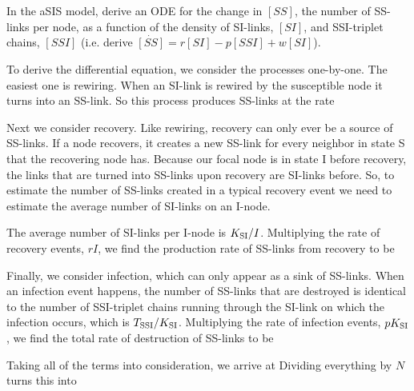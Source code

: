 In the aSIS model, derive an ODE for the change in $[SS]$, the number of SS-links per node, as a function of the density of SI-links, $[SI]$, and SSI-triplet chains, $[SSI]$ (i.e. derive $\dot{[SS]} = r[SI]-p[SSI]+w[SI]$).

\solution
To derive the differential equation, we consider the processes one-by-one. The easiest one is rewiring. When an SI-link is rewired by the susceptible node it turns into an SS-link. So this process produces SS-links at the rate 

Next we consider recovery. Like rewiring, recovery can only ever be a source of SS-links. If a node recovers, it creates a new SS-link for every neighbor in state S that the recovering node has. Because our focal node is in state I before recovery, the links that are turned into SS-links upon recovery are SI-links before. So, to estimate the number of SS-links created in a typical recovery event we need to estimate the average number of SI-links on an I-node. 

The average number of SI-links per I-node is $K_{\rm SI}/I$. Multiplying the rate of recovery events, $rI$, we find the production rate of SS-links from recovery to be 

Finally, we consider infection, which can only appear as a sink of SS-links. When an infection event happens, the number of SS-links that are destroyed is identical to the number of SSI-triplet chains running through the SI-link on which the infection occurs, which is $T_{\rm SSI}/K_{\rm SI}$. Multiplying the rate of infection events, $pK_{\rm SI}$, we find the total rate of destruction of SS-links to be 

Taking all of the terms into consideration, we arrive at 
Dividing everything by $N$ turns this into 

